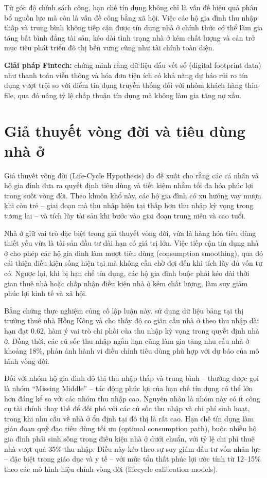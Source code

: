 \documentclass[12pt,a4paper]{report}
\begin{document}
	Từ góc độ chính sách công, hạn chế tín dụng không chỉ là vấn đề hiệu quả phân bổ nguồn lực mà còn là vấn đề công bằng xã hội. Việc các hộ gia đình thu nhập thấp và trung bình không tiếp cận được tín dụng nhà ở chính thức có thể làm gia tăng bất bình đẳng tài sản, kéo dài tình trạng nhà ở kém chất lượng và cản trở mục tiêu phát triển đô thị bền vững cũng như tài chính toàn diện.
	
	\textbf{Giải pháp Fintech:} \textcite{Berg2020} chứng minh rằng dữ liệu dấu vết số (digital footprint data) như thanh toán viễn thông và hóa đơn tiện ích có khả năng dự báo rủi ro tín dụng vượt trội so với điểm tín dụng truyền thống đối với nhóm khách hàng thin-file, qua đó nâng tỷ lệ chấp thuận tín dụng mà không làm gia tăng nợ xấu.
	
	
\section{Giả thuyết vòng đời và tiêu dùng nhà ở}

Giả thuyết vòng đời (Life-Cycle Hypothesis) do \textcite{Modigliani1963} đề xuất cho rằng các cá nhân và hộ gia đình đưa ra quyết định tiêu dùng và tiết kiệm nhằm tối đa hóa phúc lợi trong suốt vòng đời. Theo khuôn khổ này, các hộ gia đình có xu hướng vay mượn khi còn trẻ -- giai đoạn mà thu nhập hiện tại thấp hơn thu nhập kỳ vọng trong tương lai -- và tích lũy tài sản khi bước vào giai đoạn trung niên và cao tuổi.

Nhà ở giữ vai trò đặc biệt trong giả thuyết vòng đời, vừa là hàng hóa tiêu dùng thiết yếu vừa là tài sản đầu tư dài hạn có giá trị lớn. Việc tiếp cận tín dụng nhà ở cho phép các hộ gia đình làm mượt tiêu dùng (consumption smoothing), qua đó cải thiện điều kiện sống hiện tại mà không cần chờ đợi đến khi tích lũy đủ vốn tự có. Ngược lại, khi bị hạn chế tín dụng, các hộ gia đình buộc phải kéo dài thời gian thuê nhà hoặc chấp nhận điều kiện nhà ở kém chất lượng, làm suy giảm phúc lợi kinh tế và xã hội.

Bằng chứng thực nghiệm củng cố lập luận này. \textcite{Ko2017} sử dụng dữ liệu bảng tại thị trường thuê nhà Hồng Kông và cho thấy độ co giãn cầu nhà ở theo thu nhập dài hạn đạt 0.62, hàm ý vai trò chi phối của thu nhập kỳ vọng trong quyết định nhà ở. Đồng thời, các cú sốc thu nhập ngắn hạn cũng làm gia tăng nhu cầu nhà ở khoảng 18\%, phản ánh hành vi điều chỉnh tiêu dùng phù hợp với dự báo của mô hình vòng đời.

Đối với nhóm hộ gia đình đô thị thu nhập thấp và trung bình -- thường được gọi là nhóm ``Missing Middle'' -- tác động phúc lợi của hạn chế tín dụng có thể lớn hơn đáng kể so với các nhóm thu nhập cao. Nguyên nhân là nhóm này có ít công cụ tài chính thay thế để đối phó với các cú sốc thu nhập và chi phí sinh hoạt, trong khi nhu cầu về nhà ở ổn định tại đô thị là rất cao. Hạn chế tín dụng làm gián đoạn quỹ đạo tiêu dùng tối ưu (optimal consumption path), buộc nhiều hộ gia đình phải sinh sống trong điều kiện nhà ở dưới chuẩn, với tỷ lệ chi phí thuê nhà vượt quá 35\% thu nhập. Điều này kéo theo sự suy giảm đầu tư vốn nhân lực -- đặc biệt trong giáo dục và y tế -- với mức tổn thất phúc lợi ước tính từ 12--15\% theo các mô hình hiệu chỉnh vòng đời (lifecycle calibration models).
\end{document}
